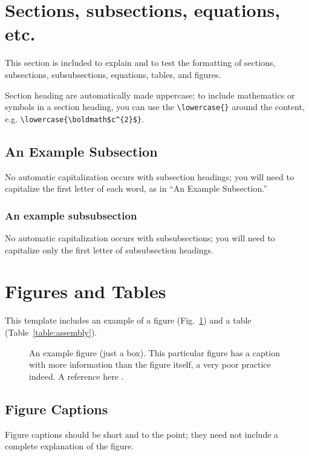 \documentclass[Journal,letterpaper,NoLineNumbers]{ascelike-new}
\begin{document}
\section{Sections, subsections, equations, etc.}

This section is included to explain and to test the formatting of sections, subsections, subsubsections, equations, tables, and figures. 

Section heading are automatically made uppercase; to include mathematics or symbols in a section heading, you can use the \verb+\lowercase{}+ around the content, e.g. \verb+\lowercase{\boldmath$c^{2}$}+.

\subsection{An Example Subsection}
No automatic capitalization occurs with subsection headings; you will need to capitalize the first letter of each word, as in ``An Example Subsection.''

\subsubsection{An example subsubsection}
No automatic capitalization occurs with subsubsections; you will need to capitalize only the first letter of subsubsection headings.

\section{Figures and Tables}

This template includes an example of a figure (Fig.~\ref{fig:box_fig}) and a table (Table~\ref{table:assembly}).

\begin{figure}
\centering
\framebox[3.00in]{\rule[0in]{0in}{1.00in}}
\caption{An example figure (just a box).  
This particular figure has a caption with more information 
than the figure itself, a very poor practice indeed.
A reference here \protect\cite{Stahl:2004a}.}
\label{fig:box_fig}
\end{figure}

\subsection{Figure Captions}

Figure captions should be short and to the point; they need not include a complete explanation of the figure.
\end{document}
